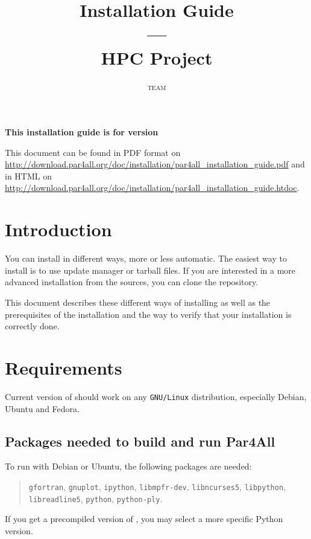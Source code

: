 \documentclass[a4paper]{article}
\newcommand{\LINK}[1]{\url{#1}\xspace}
\newcommand{\PfaInstallationPDF}{\LINK{http://download.par4all.org/doc/installation/par4all_installation_guide.pdf}}
\newcommand{\PfaAllInstallationHTDOC}{\LINK{http://download.par4all.org/doc/installation/par4all_installation_guide.htdoc}}
\begin{document}
\title{\protect\Apfa Installation Guide\\
  ---\\
  HPC Project}

\author{\Apfa \textsc{team}}

\maketitle

\noindent\textbf{This installation guide is for \Apfa version }
\bigskip

This document can be found in PDF format on \PfaInstallationPDF and in HTML
on \PfaAllInstallationHTDOC.


\section{Introduction}
\label{sec:introduction}


You can install \Apfa in different ways, more or less automatic. The easiest
way to install \Apfa is to use update manager or tarball files. If you are
interested in a more advanced installation from the sources, you can clone
the \Apfa{} \Agit repository.

This document describes these different ways of installing \Apfa as well
as the prerequisites of the installation and the way to verify that your
installation is correctly done.


\section{Requirements}
\label{sec:requirements}

Current version of \Apfa should work on any \texttt{GNU/Linux}
distribution, especially Debian, Ubuntu and Fedora.


\subsection{Packages needed to build and run Par4All}
\label{sec:pack-need-build}


To run \Apfa with Debian or Ubuntu, the following packages are needed:
\begin{quote}
  \texttt{gfortran}, \texttt{gnuplot}, \texttt{ipython},
  \texttt{libmpfr-dev}, \texttt{libncurses5}, \texttt{libpython},
  \texttt{libreadline5}, \texttt{python}, \texttt{python-ply}.
\end{quote}
If you get a precompiled version of \Apfa, you may select a more specific
Python version.
\end{document}
